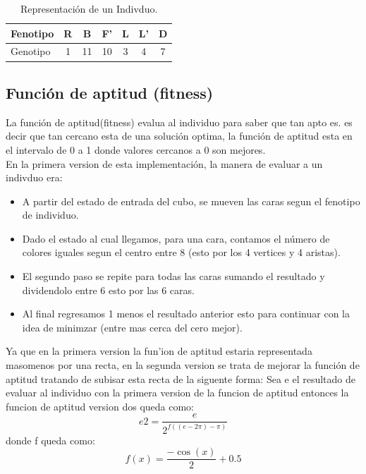 \documentclass[oneside,10pt]{article}
\begin{document}
\begin{table}[htbp]
\begin{center}
\begin{tabular}{|l|c|c|c|c|c|c|}
\hline
Fenotipo & R & B & F' & L & L'& D\\
\hline
Genotipo & 1 & 11 & 10 & 3 & 4 & 7\\
\hline
\end{tabular}
\caption{Representaci\'on de un Indivduo.}
\label{tabla:individuo}
\end{center}
\end{table}

\subsection{Funci\'on de aptitud (fitness)}
La funci\'on de aptitud(fitness) evalua al individuo para saber que tan apto es. es decir que tan cercano esta de una soluci\'on optima, la funci\'on de aptitud esta en el intervalo de 0 a 1 donde valores cercanos a 0 son mejores.\\

En la primera version de esta implementaci\'on, la manera de evaluar a un indivduo era:
\begin{itemize}
    \item A partir del estado de entrada del cubo, se mueven las caras segun el fenotipo de individuo. 
    \item Dado el estado al cual llegamos, para una cara,  contamos el n\'umero de colores iguales segun el centro entre 8 (esto por los 4 vertices y 4 aristas).
    \item El segundo paso se repite para todas las caras sumando el resultado y dividendolo entre 6 esto por las 6 caras.
    \item Al final regresamos 1 menos el resultado anterior esto para continuar con la idea de minimzar (entre mas cerca del cero mejor).
    
\end{itemize}


Ya que en la primera version la fun'ion de aptitud estaria representada masomenos por una recta, en la segunda version se trata de mejorar la funci\'on de aptitud tratando de subisar esta recta de la siguente forma: Sea e el resultado de evaluar al individuo con la primera version de la funcion de aptitud entonces la funcion de aptitud version dos queda como: $$e2 =\frac{e}{2^{f((e - 2\pi)-\pi)}}$$ donde f queda como: $$ f(x) = \frac{- \cos(x)}{2} + 0.5 $$   
\end{document}
